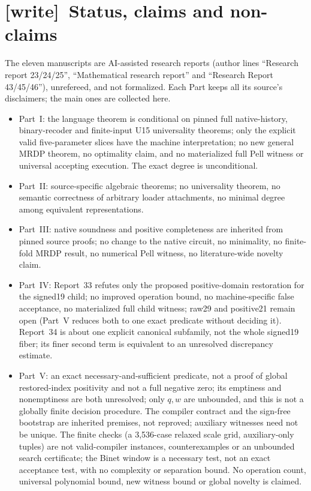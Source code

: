 \documentclass[11pt,letterpaper]{article}
\theoremstyle{definition}\newtheorem{definition}[theorem]{Definition}
\theoremstyle{remark}\newtheorem{remark}[theorem]{Remark}
\newcommand{\wtag}{\textup{[write]}}
\begin{document}
\section{\wtag\ Status, claims and non-claims}\label{fup:fm:sec:status}
The eleven manuscripts are AI-assisted research reports (author lines ``Research report 23/24/25'', ``Mathematical research report'' and ``Research Report 43/45/46''), unrefereed, and not formalized. Each Part keeps all its source's disclaimers; the main ones are collected here.
\begin{itemize}
\item Part~I: the language theorem is conditional on pinned full native-history, binary-recoder and finite-input U15 universality theorems; only the explicit valid five-parameter slices have the machine interpretation; no new general MRDP theorem, no optimality claim, and no materialized full Pell witness or universal accepting execution. The exact degree is unconditional.
\item Part~II: source-specific algebraic theorems; no universality theorem, no semantic correctness of arbitrary loader attachments, no minimal degree among equivalent representations.
\item Part~III: native soundness and positive completeness are inherited from pinned source proofs; no change to the native circuit, no minimality, no finite-fold MRDP result, no numerical Pell witness, no literature-wide novelty claim.
\item Part~IV: Report~33 refutes only the proposed positive-domain restoration for the signed19 child; no improved operation bound, no machine-specific false acceptance, no materialized full child witness; raw29 and positive21 remain open (Part~V reduces both to one exact predicate without deciding it). Report~34 is about one explicit canonical subfamily, not the whole signed19 fiber; its finer second term is equivalent to an unresolved discrepancy estimate.
\item Part~V: an exact necessary-and-sufficient predicate, not a proof of global restored-index positivity and not a full negative zero; its emptiness and nonemptiness are both unresolved; only $q,w$ are unbounded, and this is not a globally finite decision procedure. The compiler contract and the sign-free bootstrap are inherited premises, not reproved; auxiliary witnesses need not be unique. The finite checks (a 3,536-case relaxed scale grid, auxiliary-only tuples) are not valid-compiler instances, counterexamples or an unbounded search certificate; the Binet window is a necessary test, not an exact acceptance test, with no complexity or separation bound. No operation count, universal polynomial bound, new witness bound or global novelty is claimed.

\end{itemize}
\end{document}
